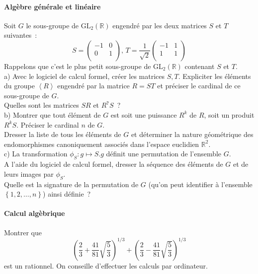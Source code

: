 \documentclass[a4paper,10pt]{article}
\begin{document}
\paragraph{Algèbre générale et linéaire}
Soit $G$ le sous-groupe de $\textrm{GL} _2 (\mathbb{R})$ engendré par les deux
matrices $S$ et $T$ suivantes~:
$$S = \left( {
\begin{array}{cc}
 { - 1} & 0  \\
 0 & 1  \\
\end{array}
} \right)\text{, }T = \frac{1}{{\sqrt 2 }}\left( {
\begin{array}{cc}
 { - 1} & 1  \\
 1 & 1  \\
\end{array}
} \right)$$
Rappelons que c'est le plus petit sous-groupe de $\textrm{GL} _2 (\mathbb{R})$
contenant $S$ et $T$.\\
a) Avec le logiciel de calcul formel, créer les matrices $S,T$. Expliciter les
éléments du groupe $\left\langle R \right\rangle $ engendré par la matrice $R =
ST$ et préciser le cardinal de ce sous-groupe de $G$.\\
Quelles sont les matrices $SR$ et $R^7 S$~?\\
b) Montrer que tout élément de $G$ est soit une puissance $R^k $ de $R$, soit un
produit $R^k S$. Préciser le cardinal $n$ de $G$.\\
Dresser la liste de tous les éléments de $G$ et déterminer la nature géométrique
des endomorphismes canoniquement associés dans l'espace euclidien $\mathbb{R}^2
$.\\
c) La transformation $\phi _S :g \mapsto S.g$ définit une permutation de
l'ensemble $G$.\\
A l'aide du logiciel de calcul formel, dresser la séquence des éléments de $G$
et de leurs images par $\phi _S $.\\
Quelle est la signature de la permutation de $G$ (qu'on peut identifier à
l'ensemble $\left\{ {1,2, \ldots ,n} \right\}$) ainsi définie~?\\


\paragraph{Calcul algèbrique}
Montrer que
$$\left( {\frac{2}{3} + \frac{{41}}{{81}}\sqrt {\frac{5}{3}} } \right)^{1 / 3}
+ \left( {\frac{2}{3} - \frac{{41}}{{81}}\sqrt {\frac{5}{3}} } \right)^{1 / 3}
$$
est un rationnel. On conseille d'effectuer les calculs par ordinateur.
\end{document}
